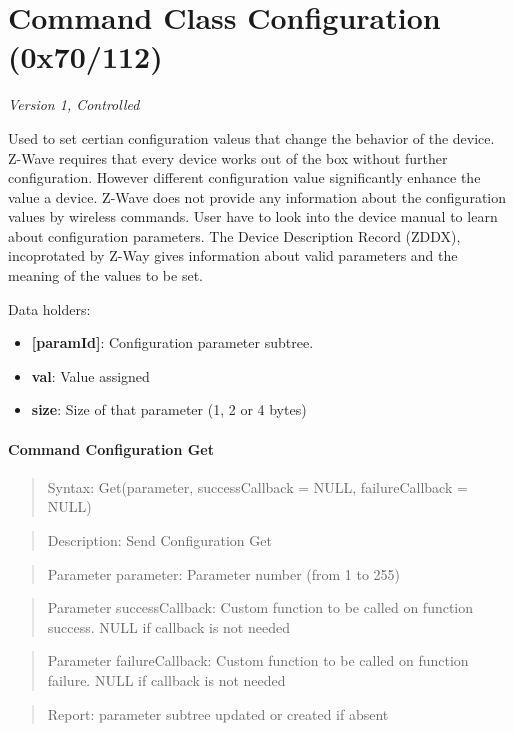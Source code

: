 \section{Command Class Configuration (0x70/112)}

\textit{Version 1, Controlled}
\newline

Used to set certian configuration valeus that change the behavior of the device. Z-Wave requires that every device works out of the box without further configuration. However different configuration value significantly enhance the value a device. Z-Wave does not provide any information about the configuration values by wireless commands. User have to look into the device manual to learn about configuration parameters. The Device Description Record (ZDDX), incoprotated by Z-Way gives information about valid parameters and the meaning of the values to be set.
\newline

\noindent
Data holders:

\begin{itemize}
\item \textbf{[paramId]}: Configuration parameter subtree.
\item \qquad\textbf{val}: Value assigned
\item \qquad\textbf{size}: Size of that parameter (1, 2 or 4 bytes)
\end{itemize}

\paragraph{Command Configuration Get}
\begin{quote}Syntax: Get(parameter, successCallback = NULL, failureCallback = NULL)\end{quote}
\begin{quote}Description: Send Configuration Get\end{quote}
\begin{quote}Parameter parameter: Parameter number (from 1 to 255)\end{quote}
\begin{quote}Parameter successCallback: Custom function to be called on function success. NULL if callback is not needed\end{quote}
\begin{quote}Parameter failureCallback: Custom function to be called on function failure. NULL if callback is not needed\end{quote}
\begin{quote}Report: parameter subtree updated or created if absent\end{quote}

